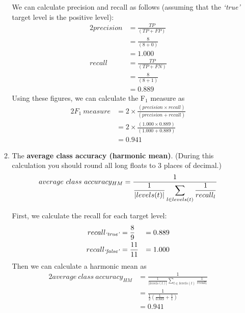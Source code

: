 \documentclass[solution]{ditpaper}
\newcommand{\featL}[1]{\textit{`#1'}}
\begin{document}
\begin{enumerate}
\begin{enumerate}
\begin{answer}
We can calculate precision and recall as follows (assuming that the \featL{true} target level is the positive level):
\begin{alignat*}{2}
precision & = \frac{TP}{\left(TP + FP\right)} \\
& = \frac{8}{\left(8 + 0\right)} \\
& = 1.000 \\
recall & = \frac{TP}{\left(TP + FN\right)} \\
& = \frac{8}{\left(8 + 1\right)} \\
& = 0.889
\end{alignat*}
Using these figures, we can calculate the F$_1$ measure as
\begin{alignat*}{2}
F_1~measure & = 2 \times \frac{\left(precision \times recall \right)}{\left(precision + recall\right)} \\
& = 2 \times \frac{\left(1.000 \times 0.889 \right)}{\left(1.000 + 0.889\right)} \\
& = 0.941
\end{alignat*}
\end{answer}
\item The \textbf{average class accuracy (harmonic mean)}. (During this calculation you should round all long floats to 3 places of decimal.)
\begin{equation*}
average~class~accuracy_{HM} = \displaystyle \frac{1}{\displaystyle \frac{1}{|levels(t)|}\sum_{l \in levels(t)} \frac{1}{recall_l}} \\
\end{equation*}
\begin{answer}
First, we calculate the recall for each target level:
\begin{alignat*}{3}
recall_{\text{\featL{true}}} & = \frac{8}{9} & = 0.889 \\
recall_{\text{\featL{false}}} & = \frac{11}{11} & = 1.000 
\end{alignat*}
Then we can calculate a harmonic mean as
\begin{alignat*}{2}
average~class~accuracy_{HM} & = \displaystyle \frac{1}{\displaystyle \frac{1}{|levels(t)|}\sum_{l \in levels(t)} \frac{1}{recall_l}} \\
& = \displaystyle \frac{1}{\displaystyle \frac{1}{2}\left( \frac{1}{0.889} + \frac{1}{1} \right) } \\
& = 0.941
\end{alignat*}
\end{answer}
\end{enumerate} 
\end{enumerate}
\end{document}
